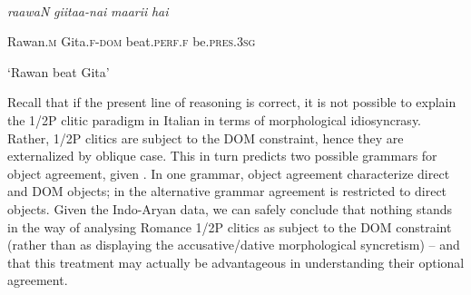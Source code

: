\documentclass[output=paper]{langscibook}
\begin{document}
\ea\label{ex:key:}
{}\\
\z

\textit{raawaN}   \textit{giitaa-nai}  \textit{maarii}    \textit{hai}



  Rawan\textsc{.m}   Gita.\textsc{f-dom}   beat.\textsc{perf.f}    be.\textsc{pres.3sg}


  ‘Rawan beat Gita’

Recall that if the present line of reasoning is correct, it is not possible to explain the 1/2P clitic paradigm in Italian in terms of morphological idiosyncrasy. Rather, 1/2P clitics are subject to the DOM constraint, hence they are externalized by oblique case. This in turn predicts two possible grammars for object agreement, given . In one grammar, object agreement characterize direct and DOM objects; in the alternative grammar agreement is restricted to direct objects. Given the Indo-Aryan data, we can safely conclude that nothing stands in the way of analysing Romance 1/2P clitics as subject to the DOM constraint (rather than as displaying the accusative/dative morphological syncretism) – and that this treatment may actually be advantageous in understanding their optional agreement. 
\end{document}
